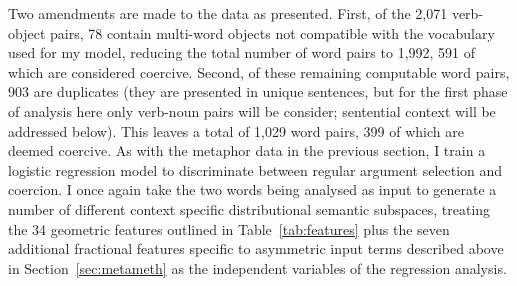 Two amendments are made to the data as presented.  First, of the 2,071 verb-object pairs, 78 contain multi-word objects not compatible with the vocabulary used for my model, reducing the total number of word pairs to 1,992, 591 of which are considered coercive.  Second, of these remaining computable word pairs, 903 are duplicates (they are presented in unique sentences, but for the first phase of analysis here only verb-noun pairs will be consider; sentential context will be addressed below).  This leaves a total of 1,029 word pairs, 399 of which are deemed coercive.  As with the metaphor data in the previous section, I train a logistic regression model to discriminate between regular argument selection and coercion.  I once again take the two words being analysed as input to generate a number of different context specific distributional semantic subspaces, treating the 34 geometric features outlined in Table~\ref{tab:features} plus the seven additional fractional features specific to asymmetric input terms described above in Section~\ref{sec:metameth} as the independent variables of the regression analysis.  


